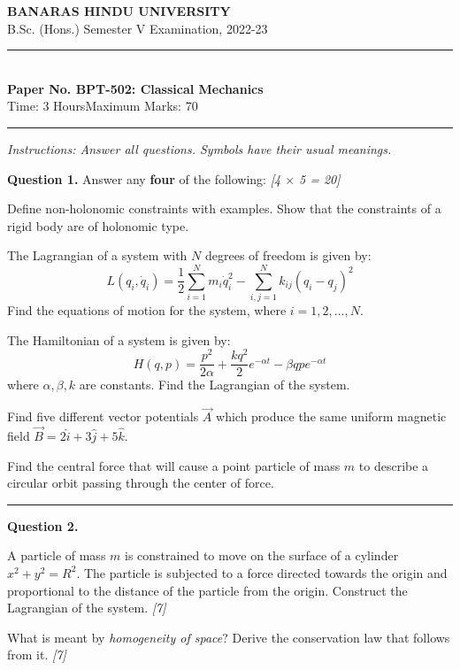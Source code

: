 \documentclass[11pt,a4paper]{article}
\newcommand{\pts}[1]{\hfill   \textit{[#1]}}
\begin{document}
\begin{center}
  {\large\bfseries BANARAS HINDU UNIVERSITY}\\[2pt]
  {\normalsize B.Sc. (Hons.) Semester V Examination, 2022-23}\\[6pt]
  \rule{0.8\linewidth}{0.5pt}\\[6pt]
  {\large\bfseries Paper No. BPT-502: Classical Mechanics}\\[4pt]
  {\normalsize Time: 3 Hours\hfill Maximum Marks: 70}
\end{center}
\rule{\linewidth}{0.4pt}
\smallskip



\noindent   \textit{Instructions: Answer all questions. Symbols have their usual meanings.}
\bigskip




\noindent   \textbf{Question 1.} Answer any   \textbf{four} of the following: \pts{4 $ \times$ 5 = 20}

\begin{parts}
  \item Define non-holonomic constraints with examples. Show that the constraints of a rigid body are of holonomic type.
  \item The Lagrangian of a system with $N$ degrees of freedom is given by:
    \[ L(q_i, \dot{q}_i) = \frac{1}{2} \sum_{i=1}^N m_i \dot{q}_i^2 - \sum_{i,j=1}^N k_{ij} (q_i - q_j)^2 \]
    Find the equations of motion for the system, where $i = 1, 2, \dots, N$.
  \item The Hamiltonian of a system is given by:
    \[ H(q, p) = \frac{p^2}{2\alpha} + \frac{kq^2}{2} e^{-\alpha t} - \beta q p e^{-\alpha t} \]
    where $\alpha, \beta, k$ are constants. Find the Lagrangian of the system.
  \item Find five different vector potentials $\vec{A}$ which produce the same uniform magnetic field $\vec{B} = 2\hat{i} + 3\hat{j} + 5\hat{k}$.
  \item Find the central force that will cause a point particle of mass $m$ to describe a circular orbit passing through the center of force.
\end{parts}

\medskip\rule{\linewidth}{0.2pt}




\noindent   \textbf{Question 2.}

\begin{parts}
  \item A particle of mass $m$ is constrained to move on the surface of a cylinder $x^2 + y^2 = R^2$. The particle is subjected to a force directed towards the origin and proportional to the distance of the particle from the origin. Construct the Lagrangian of the system. \pts{7}
  \item What is meant by   \textit{homogeneity of space}? Derive the conservation law that follows from it. \pts{7}
\end{parts}
\end{document}
